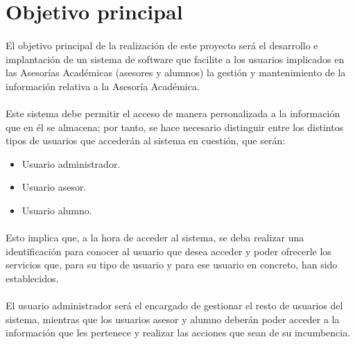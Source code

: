 \section{Objetivo principal}

\paragraph{}El objetivo principal de la realización de este proyecto será el
desarrollo e implantación de un sistema de software que facilite a los usuarios
implicados en las Asesorías Académicas (asesores y alumnos) la gestión y
mantenimiento de la información relativa a la Asesoría Académica.

\paragraph{}Este sistema debe permitir el acceso de manera personalizada a la
información que en él se almacena; por tanto, se hace necesario distinguir entre
los distintos tipos de usuarios que accederán al sistema en cuestión, que serán:

\begin{itemize}
 \item Usuario administrador.
 \item Usuario asesor.
 \item Usuario alumno.
\end{itemize}

\paragraph{}Esto implica que, a la hora de acceder al sistema, se deba realizar
una identificación para conocer al usuario que desea acceder y poder ofrecerle
los servicios que, para su tipo de usuario y para ese usuario en concreto, han
sido establecidos.

\paragraph{}El usuario administrador será el encargado de gestionar el resto de
usuarios del sistema, mientras que los usuarios asesor y alumno deberán poder
acceder a la información que les pertenece y realizar las acciones que sean de
su incumbencia.